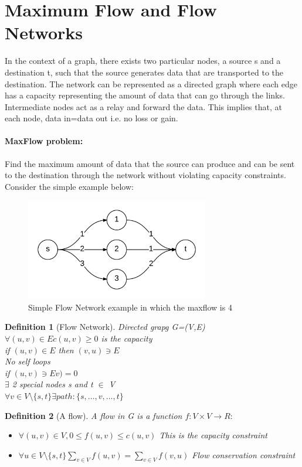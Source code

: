 \documentclass[12pt,letterpaper]{article}
\newtheorem{definition}{Definition}[section]
\begin{document}
\section{Maximum Flow and Flow Networks}
In the context of a graph, there exists two particular nodes, a source s and a destination t, such that the source generates data that are transported to the destination. The network can be represented as a directed graph where each edge has a capacity representing the amount of data that can go through the links. Intermediate nodes act as a relay and forward the data. This implies that, at each node, data in=data out i.e. no loss or gain. 
\paragraph{MaxFlow problem:} Find the maximum amount of data that the source can produce and can be sent to the destination through the network without violating capacity constraints. Consider the simple example below:
\begin{figure}[h]
\centering
\includegraphics[width=8cm]{mfsimple}
\caption{Simple Flow Network example in which the maxflow is 4}
\end{figure}
\begin{definition}[Flow Network]
Directed grapg G=(V,E)\\
$\forall (u,v)\in E c(u,v)\geq 0$ is the capacity\\
if $(u,v)\in E$ then $(v,u)\ni E$\\
No self loops\\
if $(u,v)\ni Ev)=0$\\
$\exists$ 2 special nodes s and t $\in$ V\\
$\forall v \in V\setminus \{s,t\} \exists path: \{s,\dots,v,\dots,t\}$ 
\end{definition}
\begin{definition}[A flow]
A flow in G is a function $f: V\times V\to R:$
\begin{itemize}
\item $\forall (u,v)\in V, 0\leq f(u,v)\leq c(u,v)$ This is the capacity constraint
\item $\forall u \in V\setminus\{s,t\} \sum_{v\in V}f(u,v)=\sum_{v\in V}f(v,u)$ Flow conservation constraint
\end{itemize} 
\end{definition}
\end{document}
